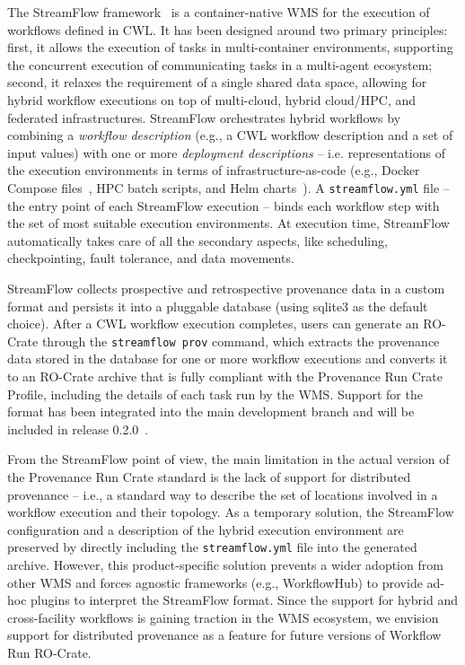 \documentclass[10pt,letterpaper]{article}
\begin{document}
The StreamFlow framework~\cite{Colonnelli 2021} is a container-native WMS for the execution of workflows defined in CWL.
It has been designed around two primary principles: first, it allows the execution of tasks in multi-container environments, supporting the concurrent execution of communicating tasks in a multi-agent ecosystem; second, it relaxes the requirement of a single shared data space, allowing for hybrid workflow executions on top of multi-cloud, hybrid cloud/HPC, and federated infrastructures.
StreamFlow orchestrates hybrid workflows by combining a \emph{workflow description} (e.g., a CWL workflow description and a set of input values) with one or more \emph{deployment descriptions} -- i.e.
representations of the execution environments in terms of infrastructure-as-code (e.g., Docker Compose files~\cite{Reis 2022}, HPC batch scripts, and Helm charts~\cite{Zerouali 2023}).
A \texttt{streamflow.yml} file -- the entry point of each StreamFlow execution -- binds each workflow step with the set of most suitable execution environments.
At execution time, StreamFlow automatically takes care of all the secondary aspects, like scheduling, checkpointing, fault tolerance, and data movements.

StreamFlow collects prospective and retrospective provenance data in a custom format and persists it into a pluggable database (using sqlite3 as the default choice).
After a CWL workflow execution completes, users can generate an RO-Crate through the \texttt{streamflow prov}
command, which extracts the provenance data stored in the database for one or more workflow executions and converts it to an RO-Crate archive that is fully compliant with the Provenance Run Crate Profile, including the details of each task run by the WMS.
Support for the format has been integrated into the main development branch and will be included in release 0.2.0~\cite{Colonnelli 2023b}.

From the StreamFlow point of view, the main limitation in the actual version of the Provenance Run Crate standard is the lack of support for distributed provenance -- i.e., a standard way to describe the set of locations involved in a workflow execution and their topology. As a temporary solution,
the StreamFlow configuration and a description of the hybrid execution environment are preserved by directly including the \texttt{streamflow.yml} file into the generated archive.
However, this product-specific solution prevents a wider adoption from other WMS and forces agnostic frameworks (e.g., WorkflowHub) to provide ad-hoc plugins to interpret the StreamFlow format.
Since the support for hybrid and cross-facility workflows is gaining traction in the WMS ecosystem, we envision support for distributed provenance as a feature for future versions of Workflow Run RO-Crate.
\end{document}
